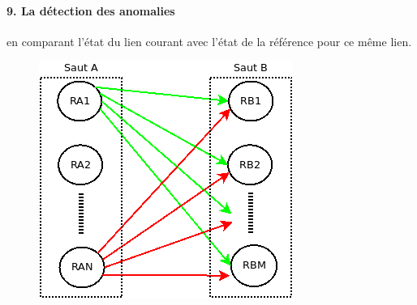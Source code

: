 \documentclass[]{report}
\begin{document}
  \paragraph{9. La détection des anomalies } en comparant l'état du lien courant avec l'état de la référence pour ce même lien.

\begin{figure}[H]
	\centering
	\includegraphics[width=0.5\linewidth]{illustrations/link-inference}
	\caption{}
	\label{fig:link-inference}
\end{figure}
\end{document}
